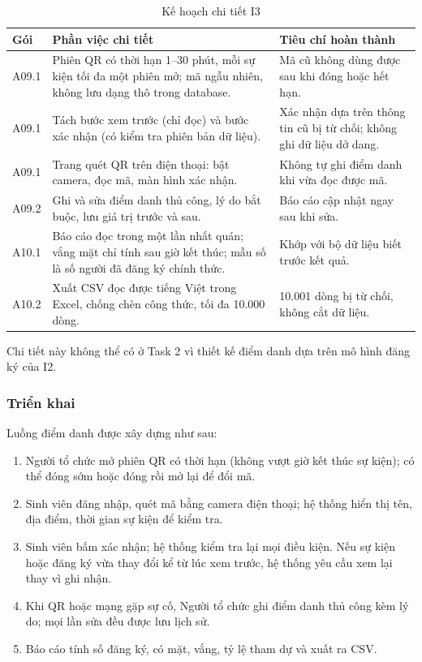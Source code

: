 \begin{table}[H]
\centering\small
\caption{Kế hoạch chi tiết I3}\label{tab:t3-lower-i3}
\begin{tabularx}{\linewidth}{@{}p{.09\linewidth}Xp{.32\linewidth}@{}}
\toprule
\textbf{Gói} & \textbf{Phần việc chi tiết} & \textbf{Tiêu chí hoàn thành}\\\midrule
A09.1 & Phiên QR có thời hạn 1--30 phút, mỗi sự kiện tối đa một phiên mở; mã ngẫu nhiên, không lưu dạng thô trong database. & Mã cũ không dùng được sau khi đóng hoặc hết hạn.\\
A09.1 & Tách bước xem trước (chỉ đọc) và bước xác nhận (có kiểm tra phiên bản dữ liệu). & Xác nhận dựa trên thông tin cũ bị từ chối; không ghi dữ liệu dở dang.\\
A09.1 & Trang quét QR trên điện thoại: bật camera, đọc mã, màn hình xác nhận. & Không tự ghi điểm danh khi vừa đọc được mã.\\
A09.2 & Ghi và sửa điểm danh thủ công, lý do bắt buộc, lưu giá trị trước và sau. & Báo cáo cập nhật ngay sau khi sửa.\\
A10.1 & Báo cáo đọc trong một lần nhất quán; vắng mặt chỉ tính sau giờ kết thúc; mẫu số là số người đã đăng ký chính thức. & Khớp với bộ dữ liệu biết trước kết quả.\\
A10.2 & Xuất CSV đọc được tiếng Việt trong Excel, chống chèn công thức, tối đa 10.000 dòng. & 10.001 dòng bị từ chối, không cắt dữ liệu.\\
\bottomrule
\end{tabularx}
\end{table}

Chi tiết này không thể có ở Task 2 vì thiết kế điểm danh dựa trên mô hình đăng ký của I2.

\subsubsection{Triển khai}

Luồng điểm danh được xây dựng như sau:
\begin{enumerate}
    \item Người tổ chức mở phiên QR có thời hạn (không vượt giờ kết thúc sự kiện); có thể đóng sớm hoặc đóng rồi mở lại để đổi mã.
    \item Sinh viên đăng nhập, quét mã bằng camera điện thoại; hệ thống hiển thị tên, địa điểm, thời gian sự kiện để kiểm tra.
    \item Sinh viên bấm xác nhận; hệ thống kiểm tra lại mọi điều kiện. Nếu sự kiện hoặc đăng ký vừa thay đổi kể từ lúc xem trước, hệ thống yêu cầu xem lại thay vì ghi nhận.
    \item Khi QR hoặc mạng gặp sự cố, Người tổ chức ghi điểm danh thủ công kèm lý do; mọi lần sửa đều được lưu lịch sử.
    \item Báo cáo tính số đăng ký, có mặt, vắng, tỷ lệ tham dự và xuất ra CSV.
\end{enumerate}

